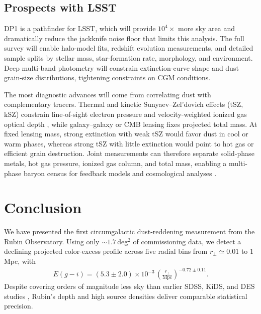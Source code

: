 \documentclass[linenumbers, twocolumn]{aastex701}
\begin{document}
\subsection{Prospects with LSST}
\label{sec:lsst}

DP1 is a pathfinder for LSST, which will provide $10^4 \times$ more sky area and dramatically reduce the jackknife noise floor that limits this analysis.
The full survey will enable halo-model fits, redshift evolution measurements, and detailed sample splits by stellar mass, star-formation rate, morphology, and environment.
Deep multi-band photometry will constrain extinction-curve shape and dust grain-size distributions, tightening constraints on CGM conditions.

The most diagnostic advances will come from correlating dust with complementary tracers.
Thermal and kinetic Sunyaev--Zel'dovich effects (tSZ, kSZ) constrain line-of-sight electron pressure and velocity-weighted ionized gas optical depth \citep{amodeo2021,riedguachalla2025,riedguachalla2025b}, while galaxy--galaxy or CMB lensing fixes projected total mass.
At fixed lensing mass, strong extinction with weak tSZ would favor dust in cool or warm phases, whereas strong tSZ with little extinction would point to hot gas or efficient grain destruction.
Joint measurements can therefore separate solid-phase metals, hot gas pressure, ionized gas column, and total mass, enabling a multi-phase baryon census for feedback models and cosmological analyses \citep{singh2016,pandey2022}.



\section{Conclusion}
\label{sec:conclusion}

We have presented the first circumgalactic dust-reddening measurement from the Rubin Observatory.
Using only $\sim1.7$\,deg$^2$ of commissioning data, we detect a declining projected color-excess profile across five radial bins from $r_\perp\simeq0.01$ to $1$\,Mpc, with
\begin{align}
    E(g-i) = (5.3 \pm 2.0) \times 10^{-3} \, \left( \frac{r_\perp}{\mathrm{Mpc}} \right)^{-0.72 \pm 0.11}.
\end{align}
Despite covering orders of magnitude less sky than earlier SDSS, KiDS, and DES studies \citep{menard2010,peek2015,genc2025,mccleary2025}, Rubin's depth and high source densities deliver comparable statistical precision.
\end{document}
